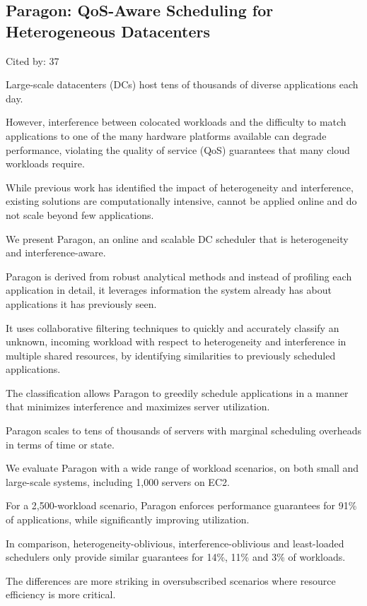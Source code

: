 \documentclass[a4paper,11pt]{article}
\begin{document}
\subsection*{Paragon: QoS-Aware Scheduling for Heterogeneous Datacenters}
{\color{cyan} {\color{magenta} Cited by: 37}

Large-scale datacenters (DCs) host tens of thousands of diverse applications each day. 

However, interference between colocated workloads and the difficulty to match applications to one of the many
hardware platforms available can degrade performance, violating the
quality of service (QoS) guarantees that many cloud workloads require.

While previous work has identified the impact of heterogeneity and interference, 
existing solutions are computationally intensive, 
cannot be applied online and do not scale beyond few applications.

We present 
{\color{black} Paragon\cite{paragon}}, 
an online and scalable DC scheduler that is heterogeneity and interference-aware. 

Paragon is derived from robust analytical methods and instead of profiling each application in detail, 
it leverages information the system already has about applications it has previously seen. 

It uses 
collaborative filtering techniques 
to quickly and accurately classify an unknown, incoming workload
with respect to heterogeneity and interference in multiple shared resources, 
by identifying similarities to previously scheduled applications.

The classification allows Paragon to greedily schedule applications 
in a manner that minimizes interference and maximizes server utilization. 

Paragon scales to tens of thousands of servers with marginal scheduling overheads in terms of time or state.

We evaluate Paragon with a wide range of workload scenarios, 
on both small and large-scale systems, including 1,000 servers on EC2.

For a 2,500-workload scenario, 
Paragon enforces performance guarantees for 91\% of applications, while significantly improving utilization.

In comparison, 
heterogeneity-oblivious, interference-oblivious and least-loaded schedulers only provide similar guarantees for 14\%, 11\% and 3\% of workloads. 

The differences are more striking in oversubscribed scenarios where resource efficiency is more critical.

}
\end{document}
